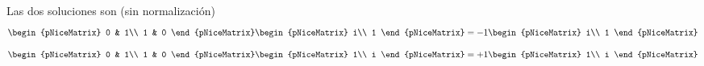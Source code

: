 Las dos soluciones son (sin normalización)
\[
  \begin{pNiceMatrix}
    0 & 1\\
    1 & 0
  \end{pNiceMatrix}
  \begin{pNiceMatrix}
    i\\
    1
  \end{pNiceMatrix}
  = -1
  \begin{pNiceMatrix}
    i\\
    1
  \end{pNiceMatrix}
\]
\[
  \begin{pNiceMatrix}
    0 & 1\\
    1 & 0
  \end{pNiceMatrix}
  \begin{pNiceMatrix}
    1\\
    i
  \end{pNiceMatrix}
  = +1
  \begin{pNiceMatrix}
    1\\
    i
  \end{pNiceMatrix}
\]

